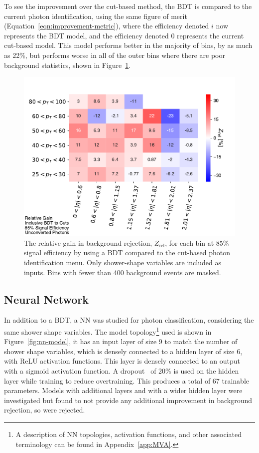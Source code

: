 To see the improvement over the cut-based method, the \gls{BDT} is compared to the current photon identification, using the same figure of merit (Equation~\ref{eqn:improvement-metric}), where the efficiency denoted $i$ now represents the \gls{BDT} model, and the efficiency denoted $0$ represents the current cut-based model. This model performs better in the majority of bins, by as much as 22\%, but performs worse in all of the outer \abseta bins where there are poor background statistics, shown in Figure~\ref{fig:gain-bdt-vs-cuts}.
\begin{figure}[!htbp]
    \centering
    \includegraphics[width=.85\textwidth]{chapters/chapter4_photonID/images/gain_BDTinclusive_cuts_unconverted.pdf}
    \caption[The relative gain in background rejection by using a \gls{BDT} compared to the cut-based photon identification menu]
    {The relative gain in background rejection, $Z_{\text{rel}}$, for each \etaPt bin at 85\% signal efficiency by using a \gls{BDT} compared to the cut-based photon identification menu. Only shower-shape variables are included as inputs. Bins with fewer than 400 background events are masked.}
    \label{fig:gain-bdt-vs-cuts}
\end{figure}


\subsection{Neural Network}\label{ssec:yid-nn}

In addition to a \gls{BDT}, a \gls{NN} was studied for photon classification, considering the same shower shape variables. The model topology\footnote{A description of \gls{NN} topologies, activation functions, and other associated terminology can be found in Appendix~\ref{app:MVA}.} used is shown in Figure~\ref{fig:nn-model}, it has an input layer of size 9 to match the number of shower shape variables, which is densely connected to a hidden layer of size 6, with ReLU activation functions. This layer is densely connected to an output with a sigmoid activation function. A dropout~\cite{dropout} of 20\% is used on the hidden layer while training to reduce overtraining. This produces a total of 67 trainable parameters. Models with additional layers and with a wider hidden layer were investigated but found to not provide any additional improvement in background rejection, so were rejected.

